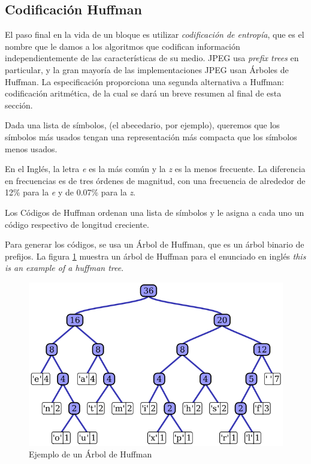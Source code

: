 
\subsection{Codificación Huffman}\label{sub:huffman}

El paso final en la vida de un bloque es utilizar \emph{codificación de
entropía}, que es el nombre que le damos a los algoritmos que codifican
información independientemente de las características de su medio. JPEG usa
\emph{prefix trees} en particular, y la gran mayoría de las implementaciones
JPEG usan Árboles de Huffman. La especificación proporciona una segunda
alternativa a Huffman: codificación aritmética, de la cual se dará un breve
resumen al final de esta sección.

Dada una lista de símbolos, (el abecedario, por ejemplo), queremos que los
símbolos más usados tengan una representación más compacta que los símbolos
menos usados.

En el Inglés, la letra \emph{ e } es la más común y la \emph{ z } es la menos
frecuente.  \cite{Espanol} La diferencia en frecuencias es de tres órdenes de
magnitud, con una frecuencia de alrededor de 12\% para la \emph{e} y de 0.07\%
para la \emph{z}.

Los \gls{Códigos de Huffman} ordenan una lista de símbolos y le asigna a cada uno un
código respectivo de longitud creciente.

Para generar los códigos, se usa un Árbol de Huffman, que es un árbol binario
de prefijos. La figura \ref{fig:huffman} muestra un árbol de Huffman para el
enunciado en inglés \emph{this is an example of a huffman tree}.

\begin{figure}[h]
    \includegraphics[width=1.0\textwidth]{Huffman}
    \caption{Ejemplo de un Árbol de Huffman}
    \label{fig:huffman}
\end{figure}

